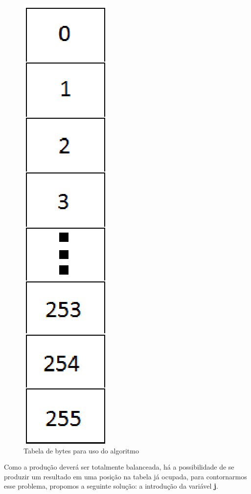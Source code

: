 \begin{figure}[h]
	\centering
	\includegraphics[scale=0.7]{figuras/tabela.eps}
	\caption{Tabela de bytes para uso do algoritmo}
\end{figure}

Como a produção deverá ser totalmente balanceada, há a possibilidade de se produzir um resultado em uma posição na tabela já ocupada, para contornarmos esse problema, propomos a seguinte solução: a introdução da variável \textbf{j}.

